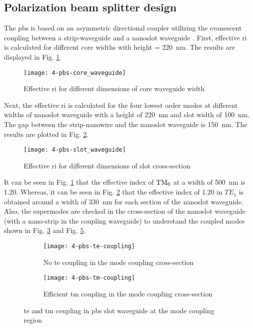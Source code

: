 \documentclass[../report.tex]{subfiles}
\begin{document}
\subsection{Polarization beam splitter design}
The \gls{pbs} is based on an asymmetric directional coupler utilizing the evanescent coupling between a strip-waveguide and a nanoslot waveguide \cite{pbs_dai_2011}. First, effective \gls{ri} is calculated for different core widths with height = \SI{220}{\nano \meter}. The results are displayed in Fig. \ref{fig:4_pbs_core_waveguide}.
\begin{figure}[H] %
	\centering
	\texttt{[image: 4-pbs-core\_waveguide]}
	\caption{Effective \gls{ri} for different dimensions of core waveguide width}
	\label{fig:4_pbs_core_waveguide}
\end{figure}
\noindent Next, the effective \gls{ri} is calculated for the four lowest order modes at different widths of nanoslot waveguide with a height of \SI{220}{\nano \meter} and slot width of \SI{100}{\nano \meter}. The gap between the strip-nanowire and the nanoslot waveguide is \SI{150}{\nano \meter}. The results are plotted in Fig. \ref{fig:4_pbs_slot_waveguide}.
\begin{figure}[H] %
	\centering
	\texttt{[image: 4-pbs-slot\_waveguide]}
	\caption{Effective \gls{ri} for different dimensions of slot cross-section}
	\label{fig:4_pbs_slot_waveguide}
\end{figure}
\noindent It can be seen in Fig. \ref{fig:4_pbs_core_waveguide} that the effective index of $\mathrm{TM_0}$ at a width of \SI{500}{\nano \meter} is 1.20. Whereas, it can be seen in Fig. \ref{fig:4_pbs_slot_waveguide} that the effective index of 1.20 in $TE_1$ is obtained around a width of \SI{330}{\nano \meter} for each section of the nanoslot waveguide. Also, the supermodes are checked in the cross-section of the nanoslot waveguide (with a nano-strip in the coupling waveguide) to understand the coupled modes shown in Fig. \ref{fig:4_pbs_te_coupling} and Fig. \ref{fig:4_pbs_tm_coupling}.
\begin{figure}[H] %
	\begin{subfigure}[t]{0.45\textwidth}
		\texttt{[image: 4-pbs-te-coupling]}
		\caption{No \gls{te} coupling in the mode coupling cross-section}
		\label{fig:4_pbs_te_coupling}
	\end{subfigure}
	\hfill
	\begin{subfigure}[t]{0.45\textwidth}
		\texttt{[image: 4-pbs-tm-coupling]}
		\caption{Efficient \gls{tm} coupling in the mode coupling cross-section}
		\label{fig:4_pbs_tm_coupling}
	\end{subfigure}
	\caption{\gls{te} and \gls{tm} coupling in \gls{pbs} slot waveguide at the mode coupling region}
\end{figure}
\end{document}
